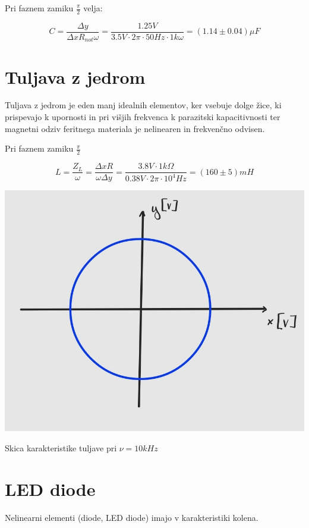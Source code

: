 \documentclass[12pt]{report}
\begin{document}
Pri faznem zamiku $\frac{\pi}{2}$ velja: 

\[
 C = \frac{\Delta y}{\Delta x R_{not} \omega} = \frac{1.25\si{V}}{3.5\si{V}\cdot 2\pi \cdot 50\si{Hz} \cdot 1k\omega} = (1.14 \pm 0.04)\mu \si{F}
\]

\section*{Tuljava z jedrom}

Tuljava z jedrom je eden manj idealnih elementov, ker vsebuje dolge žice, ki prispevajo k upornosti in pri višjih frekvenca k parazitski kapacitivnosti ter magnetni odziv feritnega materiala je nelinearen in frekvenčno odvisen. 

Pri faznem zamiku $\frac{\pi}{2}$

\[
  L = \frac{Z_L}{\omega} = \frac{\Delta x R}{\omega \Delta y} = \frac{3.8\si{V} \cdot 1k\Omega}{0.38\si{V} \cdot 2\pi \cdot 10^4\si{Hz}} = (160 \pm 5) mH 
\]

\begin{slika}[H]
  \centering
  \includegraphics{tuljava}
  \caption{\small Skica karakteristike tuljave pri $\nu = 10\si{kHz}$}
\end{slika}

\section*{LED diode}

Nelinearni elementi (diode, LED diode) imajo v karakteristiki kolena. 
\end{document}
